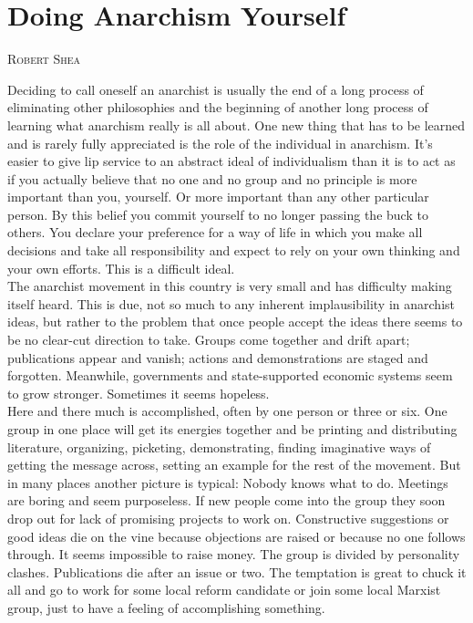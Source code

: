 \documentclass[12pt, onecolumn, letterpaper, oneside]{book}
\makeatletter
\newcommand\chapterauthor[1]{\authortoc{#1}\printchapterauthor{#1}}
\newcommand{\printchapterauthor}[1]{%
  {\parindent0pt\vspace*{-25pt}%
  \linespread{1.1}\large\scshape#1%
  \par\nobreak\vspace*{35pt}}
  \@afterheading%
}
\newcommand{\authortoc}[1]{%
  \addtocontents{toc}{\vskip-10pt}%
  \addtocontents{toc}{%
    \protect\contentsline{chapter}%
    {\hskip1.3em\mdseries\scshape\protect\scriptsize#1}{}{}}
  \addtocontents{toc}{\vskip5pt}%
}
\makeatother
\begin{document}
\chapter{Doing Anarchism Yourself}
\chapterauthor{Robert Shea}

Deciding to call oneself an anarchist is usually the end of a long process of eliminating other philosophies and the beginning of another long process of learning what anarchism really is all about. One new thing that has to be learned and is rarely fully appreciated is the role of the individual in anarchism. It's easier to give lip service to an abstract ideal of individualism than it is to act as if you actually believe that no one and no group and no principle is more important than you, yourself. Or more important than any other particular person. By this belief you commit yourself to no longer passing the buck to others. You declare your preference for a way of life in which you make all decisions and take all responsibility and expect to rely on your own thinking and your own efforts. This is a difficult ideal.\\
The anarchist movement in this country is very small and has difficulty making itself heard. This is due, not so much to any inherent implausibility in anarchist ideas, but rather to the problem that once people accept the ideas there seems to be no clear-cut direction to take. Groups come together and drift apart; publications appear and vanish; actions and demonstrations are staged and forgotten. Meanwhile, governments and state-supported economic systems seem to grow stronger. Sometimes it seems hopeless.\\
Here and there much is accomplished, often by one person or three or six. One group in one place will get its energies together and be printing and distributing literature, organizing, picketing, demonstrating, finding imaginative ways of getting the message across, setting an example for the rest of the movement. But in many places another picture is typical: Nobody knows what to do. Meetings are boring and seem purposeless. If new people come into the group they soon drop out for lack of promising projects to work on. Constructive suggestions or good ideas die on the vine because objections are raised or because no one follows through. It seems impossible to raise money. The group is divided by personality clashes. Publications die after an issue or two. The temptation is great to chuck it all and go to work for some local reform candidate or join some local Marxist group, just to have a feeling of accomplishing something.\\
\end{document}
